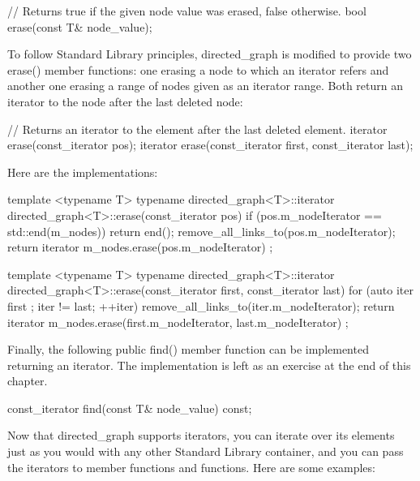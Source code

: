 \begin{cpp}
// Returns true if the given node value was erased, false otherwise.
bool erase(const T& node_value);
\end{cpp}

To follow Standard Library principles, directed\_graph is modified to provide two erase() member functions: one erasing a node to which an iterator refers and another one erasing a range of nodes given as an iterator range. Both return an iterator to the node after the last deleted node:

\begin{cpp}
// Returns an iterator to the element after the last deleted element.
iterator erase(const_iterator pos);
iterator erase(const_iterator first, const_iterator last);
\end{cpp}

Here are the implementations:

\begin{cpp}
template <typename T>
typename directed_graph<T>::iterator
    directed_graph<T>::erase(const_iterator pos)
{
    if (pos.m_nodeIterator == std::end(m_nodes)) {
        return end();
    }
    remove_all_links_to(pos.m_nodeIterator);
    return iterator { m_nodes.erase(pos.m_nodeIterator) };
}

template <typename T>
typename directed_graph<T>::iterator
    directed_graph<T>::erase(const_iterator first, const_iterator last)
{
    for (auto iter { first }; iter != last; ++iter) {
        remove_all_links_to(iter.m_nodeIterator);
    }
    return iterator { m_nodes.erase(first.m_nodeIterator, last.m_nodeIterator) };
}
\end{cpp}

Finally, the following public find() member function can be implemented returning an iterator. The implementation is left as an exercise at the end of this chapter.

\begin{cpp}
const_iterator find(const T& node_value) const;
\end{cpp}


Now that directed\_graph supports iterators, you can iterate over its elements just as you would with any other Standard Library container, and you can pass the iterators to member functions and functions. Here are some examples:

